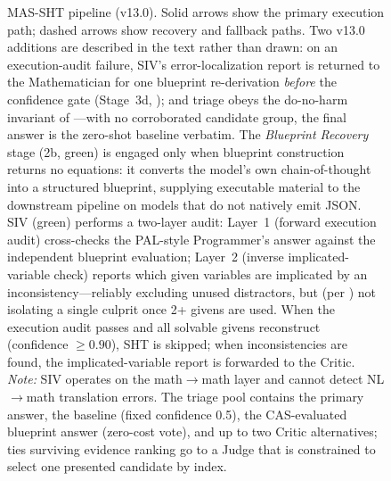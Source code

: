 \documentclass[11pt,a4paper]{article}
\begin{document}
\begin{figure}[t]
\caption{MAS-SHT pipeline (v13.0). Solid arrows show the primary execution path; dashed arrows show recovery and fallback paths. Two v13.0 additions are described in the text rather than drawn: on an execution-audit failure, SIV's error-localization report is returned to the Mathematician for one blueprint re-derivation \emph{before} the confidence gate (Stage~3d, ); and triage obeys the do-no-harm invariant of ---with no corroborated candidate group, the final answer is the zero-shot baseline verbatim. The \emph{Blueprint Recovery} stage (2b, green) is engaged only when blueprint construction returns no equations: it converts the model's own chain-of-thought into a structured blueprint, supplying executable material to the downstream pipeline on models that do not natively emit JSON. SIV (green) performs a two-layer audit: Layer~1 (forward execution audit) cross-checks the PAL-style Programmer's answer against the independent blueprint evaluation; Layer~2 (inverse implicated-variable check) reports which given variables are implicated by an inconsistency---reliably excluding unused distractors, but (per ) not isolating a single culprit once 2+ givens are used. When the execution audit passes and all solvable givens reconstruct (confidence $\geq 0.90$), SHT is skipped; when inconsistencies are found, the implicated-variable report is forwarded to the Critic. \emph{Note:} SIV operates on the math$\to$math layer and cannot detect NL$\to$math translation errors. The triage pool contains the primary answer, the baseline (fixed confidence 0.5), the CAS-evaluated blueprint answer (zero-cost vote), and up to two Critic alternatives; ties surviving evidence ranking go to a Judge that is constrained to select one presented candidate by index.}
\label{fig:architecture}
\end{figure}
\end{document}
